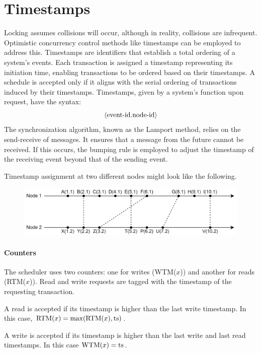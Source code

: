 \section{Timestamps}

Locking assumes collisions will occur, although in reality, collisions are infrequent.
Optimistic concurrency control methods like timestamps can be employed to address this. 
Timestamps are identifiers that establish a total ordering of a system's events. 
Each transaction is assigned a timestamp representing its initiation time, enabling transactions to be ordered based on their timestamps. 
A schedule is accepted only if it aligns with the serial ordering of transactions induced by their timestamps. 
Timestamps, given by a system's function upon request, have the syntax:
\[\left\langle \textnormal{event-id}.\textnormal{node-id} \right\rangle \]
The synchronization algorithm, known as the Lamport method, relies on the send-receive of messages. 
It ensures that a message from the future cannot be received. 
If this occurs, the bumping rule is employed to adjust the timestamp of the receiving event beyond that of the sending event.  
\begin{example}
    Timestamp assignment at two different nodes might look like the following.
    \begin{figure}[H]
        \centering
        \includegraphics[width=0.75\linewidth]{images/timestamps.png}
    \end{figure}
\end{example}

\paragraph*{Counters}
The scheduler uses two counters: one for writes (WTM($x$)) and another for reads (RTM($x$)).
Read and write requests are tagged with the timestamp of the requesting transaction.

A read is accepted if its timestamp is higher than the last write timestamp.
In this case, $\textnormal{RTM}(x)=\max(\textnormal{RTM}(x),\textnormal{ts})$. 

A write is accepted if its timestamp is higher than the last write and last read timestamps. 
In this case $\textnormal{WTM}(x)=\textnormal{ts}$. 

